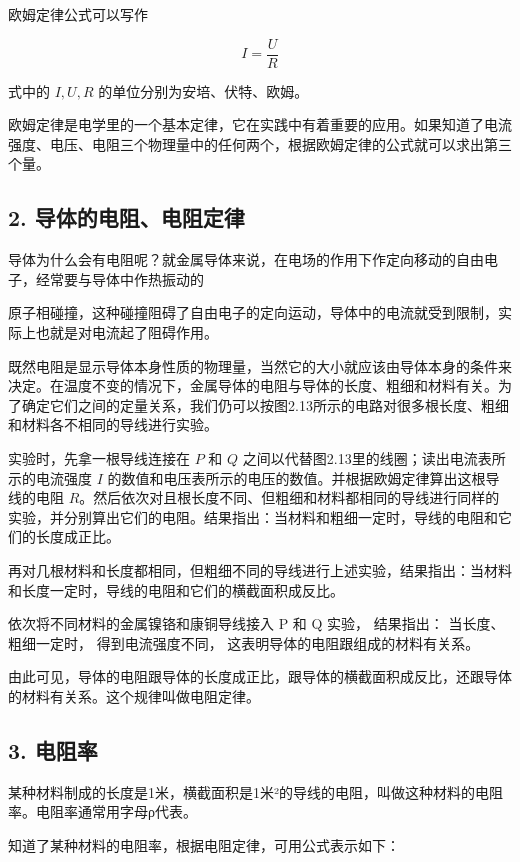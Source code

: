 欧姆定律公式可以写作

\[
I=\frac{U}{R}
\]

式中的 \(I, U, R\) 的单位分别为安培、伏特、欧姆。

欧姆定律是电学里的一个基本定律，它在实践中有着重要的应用。如果知道了电流强度、电压、电阻三个物理量中的任何两个，根据欧姆定律的公式就可以求出第三个量。

\subsection{2.
导体的电阻、电阻定律}\label{ux5bfcux4f53ux7684ux7535ux963bux7535ux963bux5b9aux5f8b}

导体为什么会有电阻呢？就金属导体来说，在电场的作用下作定向移动的自由电子，经常要与导体中作热振动的

原子相碰撞，这种碰撞阻碍了自由电子的定向运动，导体中的电流就受到限制，实际上也就是对电流起了阻碍作用。

既然电阻是显示导体本身性质的物理量，当然它的大小就应该由导体本身的条件来决定。在温度不变的情况下，金属导体的电阻与导体的长度、粗细和材料有关。为了确定它们之间的定量关系，我们仍可以按图2.13所示的电路对很多根长度、粗细和材料各不相同的导线进行实验。

实验时，先拿一根导线连接在 \(P\) 和 \(Q\)
之间以代替图2.13里的线圈；读出电流表所示的电流强度 \(I\)
的数值和电压表所示的电压的数值。并根据欧姆定律算出这根导线的电阻
\(R\)。然后依次对且根长度不同、但粗细和材料都相同的导线进行同样的实验，并分别算出它们的电阻。结果指出：当材料和粗细一定时，导线的电阻和它们的长度成正比。

再对几根材料和长度都相同，但粗细不同的导线进行上述实验，结果指出：当材料和长度一定时，导线的电阻和它们的横截面积成反比。

依次将不同材料的金属镍铬和康铜导线接入 P 和 Q 实验， 结果指出：
当长度、粗细一定时， 得到电流强度不同，
这表明导体的电阻跟组成的材料有关系。

由此可见，导体的电阻跟导体的长度成正比，跟导体的横截面积成反比，还跟导体的材料有关系。这个规律叫做电阻定律。

\subsection{3. 电阻率}\label{ux7535ux963bux7387}

某种材料制成的长度是1米，横截面积是1米²的导线的电阻，叫做这种材料的电阻率。电阻率通常用字母ρ代表。

知道了某种材料的电阻率，根据电阻定律，可用公式表示如下：


